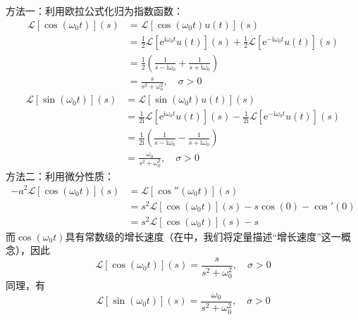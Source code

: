 \begin{example}[正弦、余弦函数]
    方法一：利用欧拉公式化归为指数函数：
    \begin{align*}
        \mathcal{L}[\cos(\omega_0 t)](s)&=\mathcal{L}[\cos(\omega_0 t)u(t)](s)\\
        &=\frac{1}{2}\mathcal{L} [\mathrm{e}^{\mathrm{i}\omega_0 t}u(t)](s)+\frac{1}{2}\mathcal{L} [\mathrm{e}^{-\mathrm{i}\omega_0 t}u(t)](s)\\
        &=\frac{1}{2}\left(\frac{1}{s-\mathrm{i}\omega_0}+\frac{1}{s+\mathrm{i}\omega_0}\right)\\
        &=\frac{s}{s^2+\omega_0^2},\quad \sigma>0
    \end{align*}
    \begin{align*}
        \mathcal{L}[\sin(\omega_0 t)](s)&=\mathcal{L} [\sin(\omega_0 t)u(t)](s)\\
        &=\frac{1}{2\mathrm{i}}\mathcal{L} [\mathrm{e}^{\mathrm{i}\omega_0 t}u(t)](s)-\frac{1}{2\mathrm{i}}\mathcal{L} [\mathrm{e}^{-\mathrm{i}\omega_0 t}u(t)](s)\\
        &=\frac{1}{2\mathrm{i}}\left(\frac{1}{s-\mathrm{i}\omega_0}-\frac{1}{s+\mathrm{i}\omega_0}\right)\\
        &=\frac{\omega_0}{s^2+\omega_0^2},\quad \sigma>0
    \end{align*}
    方法二：利用微分性质：
    \begin{align*}
        -a^2\mathcal{L}[\cos(\omega_0 t)](s)&=\mathcal{L} [\cos''(\omega_0 t)](s)\\
        &=s^2\mathcal{L} [\cos(\omega_0 t)](s)-s\cos(0)-\cos'(0)\\
        &=s^2\mathcal{L} [\cos(\omega_0 t)](s)-s
    \end{align*}
    而$\cos(\omega_0 t)$具有常数级的增长速度（在中，我们将定量描述“增长速度”这一概念），因此
    \[\mathcal{L} [\cos(\omega_0 t)](s)=\frac{s}{s^2+\omega_0^2},\quad \sigma>0\]
    同理，有\[\mathcal{L} [\sin(\omega_0 t)](s)=\frac{\omega_0}{s^2+\omega_0^2},\quad \sigma>0\]
\end{example}

